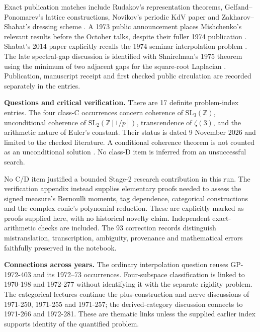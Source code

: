 Exact publication matches include Rudakov's representation theorems,
Gelfand--Ponomarev's lattice constructions, Novikov's periodic KdV paper and
Zakharov--Shabat's dressing scheme
\citep{rudakov1974irreducible,gelfandponomarev1974modular,novikov1974periodic,zakharovshabat1974scheme}.
A 1973 public announcement places
Mishchenko's relevant results before the October talks, despite their fuller
1974 publication \citep{mishchenko1973infinite}. Shabat's 2014 paper explicitly recalls the 1974 seminar
interpolation problem \citep{shabat2014interpolation}. The late spectral-gap discussion is identified with
Shnirelman's 1975 theorem using the minimum of two adjacent gaps for the
square-root Laplacian \citep{shnirelman1975multiplicity}. Publication, manuscript receipt and first checked
public circulation are recorded separately in the entries.

\medskip\noindent\textbf{Questions and critical verification.}
There are 17 definite problem-index entries. The four class-C
occurrences concern coherence of \(\mathrm{SL}_3(\mathbb Z)\), unconditional
coherence of \(\mathrm{SL}_2(\mathbb Z[1/p])\), transcendence of \(\zeta(3)\),
and the arithmetic nature of Euler's constant. Their status is dated
9 November 2026 and limited to the checked literature. A conditional
coherence theorem is not counted as an unconditional solution
\citep[Theorem~4.2, version~3]{brody2025commensurator}. No class-D
item is inferred from an unsuccessful search.

No C/D item justified a bounded Stage-2 research contribution in this run.
The verification appendix instead supplies elementary proofs needed to
assess the signed measure's Bernoulli moments, tag dependence, categorical
constructions and the complex conic's polynomial reduction. These are explicitly marked as proofs
supplied here, with no historical novelty claim. Independent exact-arithmetic
checks are included. The 93 correction records distinguish mistranslation,
transcription, ambiguity, provenance and mathematical errors faithfully
preserved in the notebook.

\medskip\noindent\textbf{Connections across years.}
The ordinary interpolation question reuses GP-1972-403 and its 1972--73
occurrences. Four-subspace classification is linked to 1970-198 and
1972-277 without identifying it with the separate rigidity problem.
The categorical lectures continue the plus-construction and nerve discussions
of 1971-250, 1971-255 and 1971-257; the derived-category discussion connects to
1971-266 and 1972-281. These are thematic links unless the supplied earlier
index supports identity of the quantified problem.
